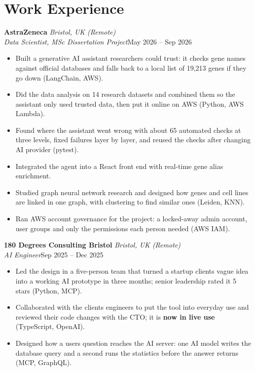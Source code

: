 \documentclass[a4paper,11pt]{article}
\newcommand{\role}[4]{%
  \textbf{#1}{\color{muted}\,\textperiodcentered\,\textit{#2}}\\
  \textit{#4}\hfill{\color{muted}#3}\par}
\newcommand{\gap}{\vspace{5pt}}
\newcommand{\num}[1]{\textbf{#1}}   %
\begin{document}
\section{Work Experience}
\role{AstraZeneca}{Bristol, UK (Remote)}{May 2026 – Sep 2026}{Data Scientist, MSc Dissertation Project}
\begin{itemize}
  \item Built a generative AI assistant researchers could trust: it checks gene names against official databases and falls back to a local list of 19,213 genes if they go down (LangChain, AWS).
  \item Did the data analysis on 14 research datasets and combined them so the assistant only used trusted data, then put it online on AWS (Python, AWS Lambda).
  \item Found where the assistant went wrong with about 65 automated checks at three levels, fixed failures layer by layer, and reused the checks after changing AI provider (pytest).
  \item Integrated the agent into a React front end with real-time gene alias enrichment.
  \item Studied graph neural network research and designed how genes and cell lines are linked in one graph, with clustering to find similar ones (Leiden, KNN).
  \item Ran AWS account governance for the project: a locked-away admin account, user groups and only the permissions each person needed (AWS IAM).
\end{itemize}
\gap
{}
\role{180 Degrees Consulting Bristol}{Bristol, UK (Remote)}{Sep 2025 – Dec 2025}{AI Engineer}
\begin{itemize}
  \item Led the design in a five-person team that turned a startup client\textquotesingle{}s vague idea into a working AI prototype in three months; senior leadership rated it 5 stars (Python, MCP).
  \item Collaborated with the client\textquotesingle{}s engineers to put the tool into everyday use and reviewed their code changes with the CTO; it is \num{now in live use} (TypeScript, OpenAI).
  \item Designed how a user\textquotesingle{}s question reaches the AI server: one AI model writes the database query and a second runs the statistics before the answer returns (MCP, GraphQL).
\end{itemize}
\end{document}
